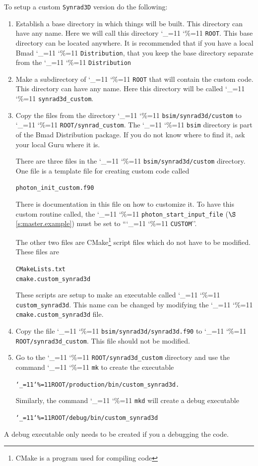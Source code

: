 \documentclass[11pt,openany]{report}
\newcommand{\sref}[1]{$\S$\ref{#1}}
\newcommand{\srthree}{\texttt{Synrad3D}\xspace}
\newcommand\ttcmd{\begingroup\catcode`\_=11 \catcode`\%=11 \dottcmd}
\newcommand\dottcmd[1]{\texttt{#1}\endgroup}
\newcommand{\vn}{\ttcmd}
\newlength{\ExBeg}
\newlength{\ExEnd}
\newenvironment{example}
  {\vspace{\ExBeg} \begin{alltt}}
  {\end{alltt} \vspace{\ExEnd}}
\begin{document}
{{{{To setup a custom \srthree version do the following:
  \begin{enumerate}
  \item
Establish a base directory in which things will be built. This directory can have any name. Here we
will call this directory \vn{ROOT}. This base directory can be located anywhere. It is recommended that
if you have a local Bmad \vn{Distribution}, that you keep the base directory separate from the \vn{Distribution}
  \item
Make a subdirectory of \vn{ROOT} that will contain the custom code. This directory can have any
name.  Here this directory will be called \vn{synrad3d_custom}.
  \item
Copy the files from the directory \vn{bsim/synrad3d/custom} to \vn{ROOT/synrad_custom}. The
\vn{bsim} directory is part of the Bmad Distribution package. If you do not know where to find it, ask your
local Guru where it is. 

There are three files in the \vn{bsim/synrad3d/custom} directory. One file is a template file for 
creating custom code called
\begin{example}
  photon_init_custom.f90
\end{example}
There is documentation in this file on how to customize it. To have this custom routine called, the
\vn{photon_start_input_file} (\sref{s:master.example}) must be set to ``\vn{CUSTOM}''.

The other two files are CMake\footnote{CMake is a program used for
compiling code} script files which do not have to be modified. These files are
\begin{example}
  CMakeLists.txt
  cmake.custom_synrad3d
\end{example}
These scripts are setup to make an executable called \vn{custom_synrad3d}. This name can be changed
by modifying the \vn{cmake.custom_synrad3d} file.
  \item
Copy the file \vn{bsim/synrad3d/synrad3d.f90} to \vn{ROOT/synrad3d_custom}. This file should not
be modified.
  \item
Go to the \vn{ROOT/synrad3d_custom} directory and use the command \vn{mk} to create the
executable 
\begin{example}
    \vn{ROOT/production/bin/custom_synrad3d}. 
\end{example}
Similarly, the command \vn{mkd} will create a debug executable 
\begin{example}
    \vn{ROOT/debug/bin/custom_synrad3d}
\end{example}
	\end{enumerate}
A debug executable only needs to be created if you a debugging the code.

}}}}
\end{document}
